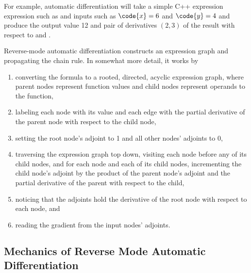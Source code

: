 \documentclass[10pt]{article}
\begin{document}
For example, automatic differentiation will take a simple C++
expression expression such as  and inputs such as
$\code{x}=6$ and $\code{y}=4$ and produce the output value 12 and pair
of derivatives $(2,3)$ of the result with respect to  and
.  

Reverse-mode automatic differentiation constructs an expression graph
and propagating the chain rule.  In somewhat more detail, it works by
%
\begin{enumerate}
\item converting the formula to a rooted, directed, acyclic expression graph,
  where parent nodes represent function values and child nodes
  represent operands to the function,
\item labeling each node with its value and each edge with 
  the partial derivative of the parent node with respect to the child
  node, 
\item setting the root node's adjoint  to 1 and all other nodes' adjoints
  to 0, 
\item traversing the expression graph top down, visiting each node
  before any of its child nodes, and for each node and each of its
  child nodes, incrementing the child node's adjoint by the product of
  the parent node's adjoint and the partial derivative of the parent
  with respect to the child,
\item noticing that the adjoints hold the derivative of the root node
  with respect to each node, and
\item reading the gradient from the input nodes' adjoints.
\end{enumerate}
%

\subsection{Mechanics of Reverse Mode Automatic Differentiation}
\end{document}
